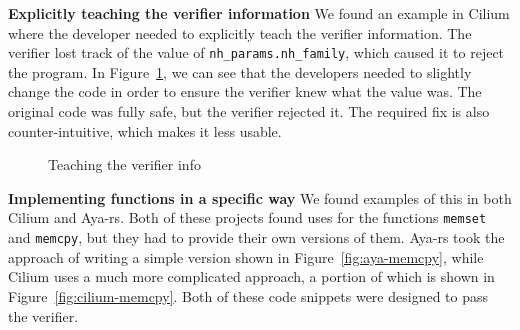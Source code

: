 
\noindent\textbf{Explicitly teaching the verifier information}
We found an example in Cilium where the developer needed to explicitly teach the verifier
    information.
The verifier lost track of the value of \texttt{nh\_params.nh\_family}, which caused it to reject the program.
In Figure~\ref{fig:teach-verifier}, we can see that the developers needed to slightly change the code in order to ensure the verifier knew what the value was.
The original code was fully safe, but the verifier rejected it.
The required fix is also counter-intuitive, which makes it less usable.

\begin{figure}
    
    \caption{Teaching the verifier info}
    \label{fig:teach-verifier}
\end{figure}

\noindent\textbf{Implementing functions in a specific way}
We found examples of this in both Cilium and Aya-rs.
Both of these projects found uses for the functions \texttt{memset} and \texttt{memcpy}, but they had to provide their own versions of them.
Aya-rs took the approach of writing a simple version shown in Figure~\ref{fig:aya-memcpy}, while Cilium uses a much more complicated approach, a portion of which is shown in Figure~\ref{fig:cilium-memcpy}.
Both of these code snippets were designed to pass the verifier.

